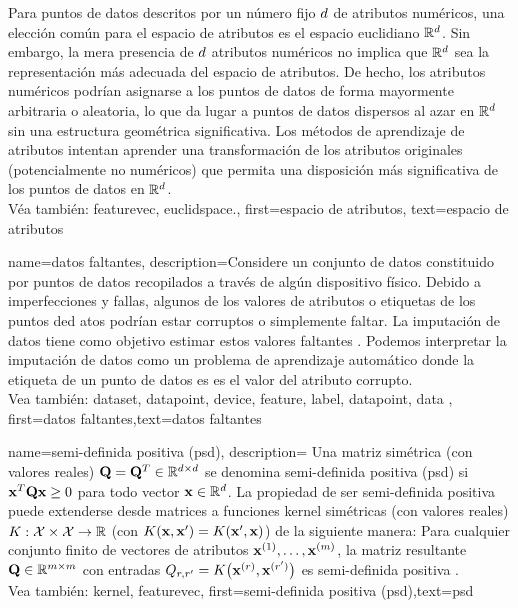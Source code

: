 {{Para puntos de datos descritos por un número fijo $d$ de atributos numéricos, 
una elección común para el espacio de atributos es el espacio euclidiano $\mathbb{R}^{d}$. 
Sin embargo, la mera presencia de $d$ atributos numéricos no implica que 
$\mathbb{R}^{d}$ sea la representación más adecuada del espacio de atributos. 
De hecho, los atributos numéricos podrían asignarse a los puntos de datos de forma mayormente arbitraria o aleatoria, 
lo que da lugar a puntos de datos dispersos al azar en $\mathbb{R}^{d}$ 
sin una estructura geométrica significativa. Los métodos de aprendizaje de atributos intentan aprender 
una transformación de los atributos originales (potencialmente no numéricos) que permita 
una disposición más significativa de los puntos de datos en $\mathbb{R}^{d}$.\\
		Véa también: \gls{featurevec}, \gls{euclidspace}.},
	first={espacio de atributos},
	text={espacio de atributos}  
}



{name={datos faltantes},
	description={Considere un conjunto de datos constituido por puntos de datos recopilados  
		a través de algún dispositivo físico. Debido a imperfecciones y fallas, algunos de los valores de atributos
		o etiquetas de los puntos ded atos podrían estar corruptos o simplemente faltar.  
		La imputación de datos tiene como objetivo estimar estos valores faltantes \cite{Abayomi2008DiagnosticsFM}. 
		Podemos interpretar la imputación de datos como un problema de aprendizaje automático donde la etiqueta de un punto de datos es 
		es el valor del atributo corrupto. 
		\\
		Vea también:  \gls{dataset}, \gls{datapoint}, \gls{device}, \gls{feature}, \gls{label}, \gls{datapoint}, \Gls{data} },
	first={datos faltantes},text={datos faltantes}  
}


{name={semi-definida positiva (psd)},
    description=
    {Una  matriz simétrica (con valores reales) $\mathbf{Q} = \mathbf{Q}^{T} \in \mathbb{R}^{d \times d}$ 
	se denomina semi-definida positiva (psd) si ${\bf x}^{T} \mathbf{Q} {\bf x} \geq 0$ para todo vector ${\bf x} \in \mathbb{R}^{d}$. 
	La propiedad de ser semi-definida positiva puede extenderse desde matrices a funciones kernel simétricas (con valores reales) 
	$K: \mathcal{X} \times \mathcal{X} \rightarrow \mathbb{R}$ 
	(con $K({\bf x},{\bf x}') = K({\bf x}',{\bf x})$)
	de la siguiente manera: Para cualquier conjunto finito de vectores de atributos ${\bf x}^{(1)},\dots,{\bf x}^{(m)}$, 
	la matriz resultante $\mathbf{Q} \in \mathbb{R}^{m \times m}$ con 
	entradas $Q_{r,r'} = K\big({\bf x}^{(r)},{\bf x}^{(r')}\big)$ 
	es semi-definida positiva \cite{LearningKernelsBook}.
	\\
		Vea también: \gls{kernel}, \gls{featurevec}},
    first={semi-definida positiva (psd)},text={psd}  
}

